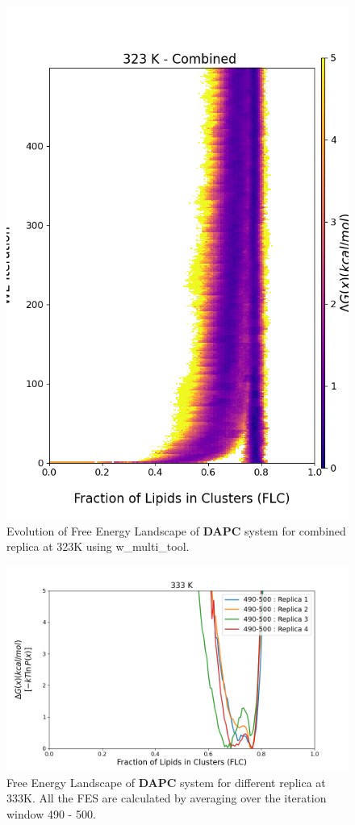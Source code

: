 \documentclass{biophys-new}
\begin{document}
\begin{figure}[hbt!]
\centering
\includegraphics[width=0.8\linewidth]{all_plots/ClusterLipids2Total/DPPC_DAPC_CHOL/323K/Evolution_DAPC_MULTI__323_ClusterLipids2Total.png}
\caption{Evolution of Free Energy Landscape of \textbf{DAPC} system for combined replica at 323K using w\_multi\_tool.}
\label{fig:view}

\end{figure}


\begin{figure}[hbt!]
\centering
\includegraphics[width=1.1\linewidth]{all_plots/ClusterLipids2Total/DPPC_DAPC_CHOL/333K/Average_DAPC_333_ClusterLipids2Total.png}
\caption{Free Energy Landscape of \textbf{DAPC} system for different replica at 333K. All the FES are calculated by averaging over the iteration window 490 - 500.}
\label{fig:view}

\end{figure}
\end{document}
